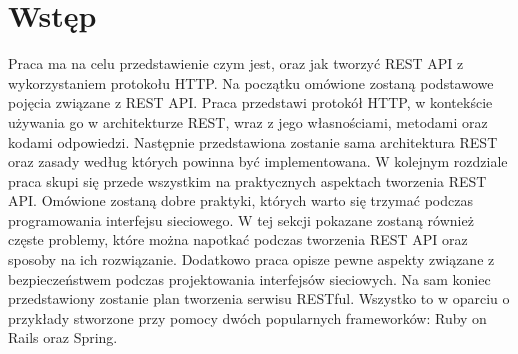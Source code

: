 \chapter*{Wstęp}
	Praca ma na celu przedstawienie czym jest, oraz jak tworzyć REST API z wykorzystaniem protokołu HTTP. Na początku omówione zostaną podstawowe pojęcia związane z REST API. Praca przedstawi protokół HTTP, w kontekście używania go w architekturze REST, wraz z jego własnościami, metodami oraz kodami odpowiedzi. Następnie przedstawiona zostanie sama architektura REST oraz zasady według których powinna być implementowana. W kolejnym rozdziale praca skupi się przede wszystkim na praktycznych aspektach tworzenia REST API. Omówione zostaną dobre praktyki, których warto się trzymać podczas programowania interfejsu sieciowego. W tej sekcji pokazane zostaną również częste problemy, które można napotkać podczas tworzenia REST API oraz sposoby na ich rozwiązanie. Dodatkowo praca opisze pewne aspekty związane z bezpieczeństwem podczas projektowania interfejsów sieciowych. Na sam koniec przedstawiony zostanie plan tworzenia serwisu RESTful. Wszystko to w oparciu o przykłady stworzone przy pomocy dwóch popularnych frameworków: Ruby on Rails oraz Spring.
	
	
	 